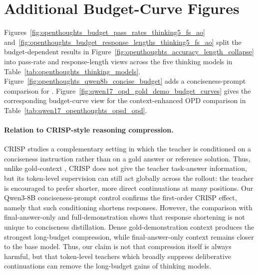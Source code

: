 \section{Additional Budget-Curve Figures}
\label{app:budget-curves}

Figures~\ref{fig:openthoughts_budget_pass_rates_thinking5_fs_ao}
and~\ref{fig:openthoughts_budget_response_lengths_thinking5_fs_ao} split the
budget-dependent results in Figure~\ref{fig:openthoughts_accuracy_length_collapse}
into pass-rate and response-length views across the five thinking models in
Table~\ref{tab:openthoughts_thinking_models}.
Figure~\ref{fig:openthoughts_qwen8b_concise_budget} adds a conciseness-prompt
comparison for \qweneightb{}.
Figure~\ref{fig:qwen17_opd_gold_demo_budget_curves} gives the corresponding
budget-curve view for the context-enhanced OPD comparison in
Table~\ref{tab:qwen17_openthoughts_opsd_opd}.

\paragraph{Relation to CRISP-style reasoning compression.}
CRISP \citep{sang2026policy} studies a complementary setting in which the
teacher is conditioned on a conciseness instruction rather than on a gold answer
or reference solution. Thus, unlike gold-context \opsd{}, CRISP does not give
the teacher task-answer information, but its token-level supervision can still
act globally across the rollout: the teacher is encouraged to prefer shorter,
more direct continuations at many positions. Our Qwen3-8B conciseness-prompt
control confirms the first-order CRISP effect, namely that such conditioning
shortens responses. However, the comparison with final-answer-only and
full-demonstration \opsd{} shows that response shortening is not unique to
conciseness distillation. Dense gold-demonstration context produces the
strongest long-budget compression, while final-answer-only context remains
closer to the base model. Thus, our claim is not that compression itself is
always harmful, but that token-level teachers which broadly suppress
deliberative continuations can remove the long-budget gains of thinking models.








